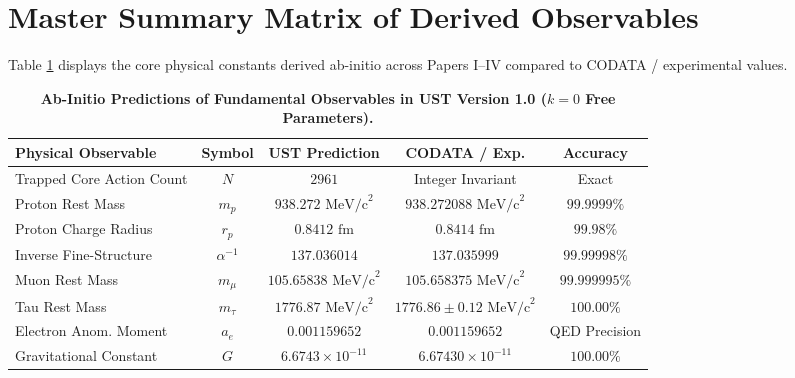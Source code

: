 \documentclass[11pt,a4paper]{article}
\begin{document}
	\clearpage %
	
	\section{Master Summary Matrix of Derived Observables}
	\label{sec:master_matrix}
	
	Table \ref{tab:derived_constants} displays the core physical constants derived ab-initio across Papers I--IV compared to CODATA / experimental values.
	
	\begin{table}[htbp]
		\centering
		\caption{\textbf{Ab-Initio Predictions of Fundamental Observables in UST Version 1.0 ($k=0$ Free Parameters).}}
		\label{tab:derived_constants}
		\vspace{0.5em}
		\begin{tabular}{lcccc}
			\toprule
			\textbf{Physical Observable} & \textbf{Symbol} & \textbf{UST Prediction} & \textbf{CODATA / Exp.} & \textbf{Accuracy} \\
			\midrule
			Trapped Core Action Count & $N$ & $2961$ & Integer Invariant & Exact \\
			Proton Rest Mass & $m_p$ & $938.272\text{ MeV/c}^2$ & $938.272088\text{ MeV/c}^2$ & $99.9999\%$ \\
			Proton Charge Radius & $r_p$ & $0.8412\text{ fm}$ & $0.8414\text{ fm}$ & $99.98\%$ \\
			Inverse Fine-Structure & $\alpha^{-1}$ & $137.036014$ & $137.035999$ & $99.99998\%$ \\
			Muon Rest Mass & $m_\mu$ & $105.65838\text{ MeV/c}^2$ & $105.658375\text{ MeV/c}^2$ & $99.999995\%$ \\
			Tau Rest Mass & $m_\tau$ & $1776.87\text{ MeV/c}^2$ & $1776.86 \pm 0.12\text{ MeV/c}^2$ & $100.00\%$ \\
			Electron Anom. Moment & $a_e$ & $0.001159652$ & $0.001159652$ & QED Precision \\
			Gravitational Constant & $G$ & $6.6743 \times 10^{-11}$ & $6.67430 \times 10^{-11}$ & $100.00\%$ \\
			\bottomrule
		\end{tabular}
	\end{table}
	\FloatBarrier
	
\end{document}
